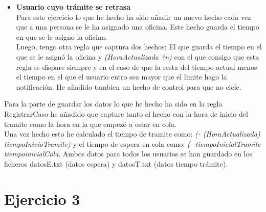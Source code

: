 \documentclass[10pt,spanish]{article}
\begin{document}
\begin{itemize}
	\item \textbf{Usuario cuyo trámite se retrasa}\\
		Para este ejercicio lo que he hecho ha sido añadir un nuevo hecho cada vez que a una persona se le ha asignado una oficina. Este hecho guarda el tiempo en que se le asigno la oficina.\\
		Luego, tengo otra regla que captura dos hechos: El que guarda el tiempo en el que se le asignó la oficina y \textit{(HoraActualizada ?n)} con el que consigo que esta regla se dispare siempre y en el caso de que la resta del tiempo actual menos el tiempo en el que el usuario entro sea mayor que el limite hago la notificación.
		He añadido tambien un hecho de control para que no cicle.
	\end{itemize}
		Para la parte de guardar los datos lo que he hecho ha sido en la regla RegistrarCaso he añadido que capture tanto el hecho con la hora de inicio del tramite como la hora en la que empezó a estar en cola. \\
		Una vez hecho esto he calculado el tiempo de tramite como: \textit{(- (HoraActualizada) tiempoInicioTramite)} y el tiempo de espera en cola como: \textit{(- tiempoInicialTramite tiempoinicialCola}.
		Ambos datos para todos los usuarios se han guardado en los ficheros datosE.txt (datos espera) y datosT.txt (datos tiempo trámite).
	\section{Ejercicio 3}
\end{document}
